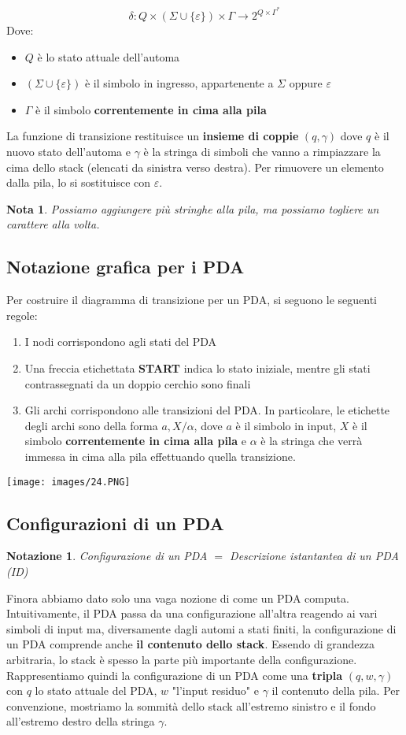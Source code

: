 \documentclass[12pt]{article}
\newtheorem{Notazione}{Notazione}[subsection]
\newtheorem{Nota}{Nota}[subsection]
\begin{document}
$$\delta: Q \times (\Sigma \cup \{\varepsilon\}) \times \Gamma \rightarrow 2^{Q \times \Gamma^*}$$
Dove:
\begin{itemize}
    \item $Q$ è lo stato attuale dell'automa
    \item $(\Sigma \cup \{\varepsilon\})$ è il simbolo in ingresso, appartenente a $\Sigma$ oppure $\varepsilon$
    \item $\Gamma$ è il simbolo \textbf{correntemente in cima alla pila}
\end{itemize}
La funzione di transizione restituisce un \textbf{insieme di coppie} $(q, \gamma)$ dove $q$ è il nuovo stato dell'automa e $\gamma$ è la stringa di simboli che vanno a rimpiazzare la cima dello stack (elencati da sinistra verso destra). Per rimuovere un elemento dalla pila, lo si sostituisce con $\varepsilon$.
\begin{Nota}
    Possiamo aggiungere più stringhe alla pila, ma possiamo togliere un carattere alla volta.
\end{Nota}
\subsection{Notazione grafica per i PDA}
Per costruire il diagramma di transizione per un PDA, si seguono le seguenti regole:
\begin{enumerate}
    \item I nodi corrispondono agli stati del PDA
    \item Una freccia etichettata \textbf{START} indica lo stato iniziale, mentre gli stati contrassegnati da un doppio cerchio sono finali
    \item Gli archi corrispondono alle transizioni del PDA. In particolare, le etichette degli archi sono della forma $a, X/\alpha$, dove $a$ è il simbolo in input, $X$ è il simbolo \textbf{correntemente in cima alla pila} e $\alpha$ è la stringa che verrà immessa in cima alla pila effettuando quella transizione.
\end{enumerate}
\begin{center}
    \texttt{[image: images/24.PNG]}
\end{center}
\subsection{Configurazioni di un PDA}
\begin{Notazione}
    Configurazione di un PDA $=$ Descrizione istantantea di un PDA (ID)
\end{Notazione}
Finora abbiamo dato solo una vaga nozione di come un PDA computa. Intuitivamente, il PDA passa da una configurazione all'altra reagendo ai vari simboli di input ma, diversamente dagli automi a stati finiti, la configurazione di un PDA comprende anche \textbf{il contenuto dello stack}. Essendo di grandezza arbitraria, lo stack è spesso la parte più importante della configurazione. Rappresentiamo quindi la configurazione di un PDA come una \textbf{tripla} $(q, w, \gamma)$ con $q$ lo stato attuale del PDA, $w$ "l'input residuo" e $\gamma$ il contenuto della pila. Per convenzione, mostriamo la sommità dello stack all'estremo sinistro e il fondo all'estremo destro della stringa $\gamma$.
\end{document}
